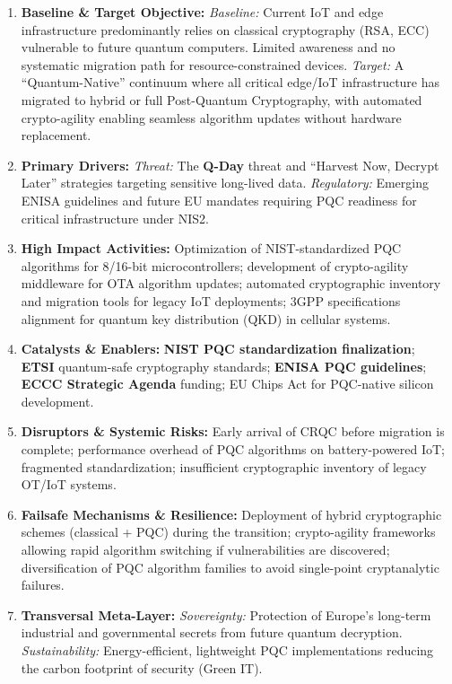 \documentclass[12pt,a4paper]{report}
\begin{document}
\begin{enumerate}
\item \textbf{Baseline \& Target Objective:}
\textit{Baseline:} Current IoT and edge infrastructure predominantly relies on classical cryptography (RSA, ECC) vulnerable to future quantum computers. Limited awareness and no systematic migration path for resource-constrained devices.
\textit{Target:} A ``Quantum-Native'' continuum where all critical edge/IoT infrastructure has migrated to hybrid or full Post-Quantum Cryptography, with automated crypto-agility enabling seamless algorithm updates without hardware replacement.

\item \textbf{Primary Drivers:} 
\textit{Threat:} The \textbf{Q-Day} threat and ``Harvest Now, Decrypt Later'' strategies targeting sensitive long-lived data.
\textit{Regulatory:} Emerging ENISA guidelines and future EU mandates requiring PQC readiness for critical infrastructure under NIS2.

\item \textbf{High Impact Activities:} 
Optimization of NIST-standardized PQC algorithms for 8/16-bit microcontrollers; development of crypto-agility middleware for OTA algorithm updates; automated cryptographic inventory and migration tools for legacy IoT deployments; 3GPP specifications alignment for quantum key distribution (QKD) in cellular systems.

\item \textbf{Catalysts \& Enablers:} 
\textbf{NIST PQC standardization finalization}; \textbf{ETSI} quantum-safe cryptography standards; \textbf{ENISA PQC guidelines}; \textbf{ECCC Strategic Agenda} funding; EU Chips Act for PQC-native silicon development.

\item \textbf{Disruptors \& Systemic Risks:} 
Early arrival of CRQC before migration is complete; performance overhead of PQC algorithms on battery-powered IoT; fragmented standardization; insufficient cryptographic inventory of legacy OT/IoT systems.

\item \textbf{Failsafe Mechanisms \& Resilience:} 
Deployment of hybrid cryptographic schemes (classical + PQC) during the transition; crypto-agility frameworks allowing rapid algorithm switching if vulnerabilities are discovered; diversification of PQC algorithm families to avoid single-point cryptanalytic failures.

\item \textbf{Transversal Meta-Layer:} 
\textit{Sovereignty:} Protection of Europe's long-term industrial and governmental secrets from future quantum decryption. \textit{Sustainability:} Energy-efficient, lightweight PQC implementations reducing the carbon footprint of security (Green IT).

\end{enumerate}
\end{document}
